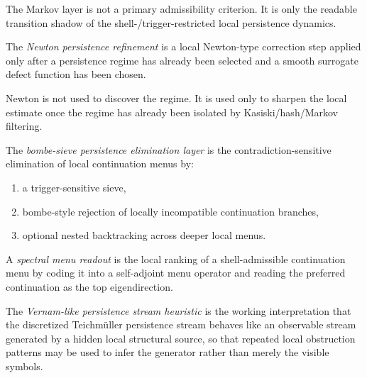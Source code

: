 \begin{remark}
\label{rem:role-of-markov-control}
The Markov layer is not a primary admissibility criterion.
It is only the readable transition shadow of the shell-/trigger-restricted local persistence dynamics.
\end{remark}

\begin{definition}
\label{def:newton-persistence-refinement}
The \emph{Newton persistence refinement} is a local Newton-type correction step applied only after a persistence regime has already been selected and a smooth surrogate defect function has been chosen.
\end{definition}

\begin{remark}
\label{rem:why-newton-comes-last}
Newton is not used to discover the regime.
It is used only to sharpen the local estimate once the regime has already been isolated by Kasiski/hash/Markov filtering.
\end{remark}

\begin{definition}
\label{def:bombe-sieve-persistence-elimination}
The \emph{bombe-sieve persistence elimination layer} is the contradiction-sensitive elimination of local continuation menus by:
\begin{enumerate}
    \item a trigger-sensitive sieve,
    \item bombe-style rejection of locally incompatible continuation branches,
    \item optional nested backtracking across deeper local menus.
\end{enumerate}
\end{definition}

\begin{definition}
\label{def:spectral-menu-readout}
A \emph{spectral menu readout} is the local ranking of a shell-admissible continuation menu by coding it into a self-adjoint menu operator and reading the preferred continuation as the top eigendirection.
\end{definition}

\begin{definition}
\label{def:vernam-like-persistence-stream-heuristic}
The \emph{Vernam-like persistence stream heuristic} is the working interpretation that the discretized Teichm\"uller persistence stream behaves like an observable stream generated by a hidden local structural source, so that repeated local obstruction patterns may be used to infer the generator rather than merely the visible symbols.
\end{definition}

